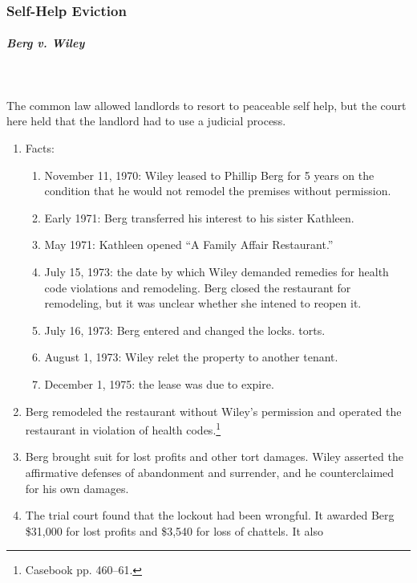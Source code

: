 \subsubsection{Self-Help Eviction}

\paragraph{\emph{Berg v. Wiley}}
~\\\\
The common law allowed landlords to resort to peaceable self help, but the 
court here held that the landlord had to use a judicial process.

\begin{enumerate}
    \item Facts:
    \begin{enumerate}
        \item November 11, 1970: Wiley leased to Phillip Berg for 5 years on 
        the condition that he would not remodel the premises without 
        permission.
        \item Early 1971: Berg transferred his interest to his sister 
        Kathleen.
        \item May 1971: Kathleen opened ``A Family Affair Restaurant.''
        \item July 15, 1973: the date by which Wiley demanded remedies for
        health code violations and remodeling. Berg closed the restaurant for 
        remodeling, but it was unclear whether she intened to reopen it.
        \item July 16, 1973: Berg entered and changed the locks.
        torts.
        \item August 1, 1973: Wiley relet the property to another tenant.
        \item December 1, 1975: the lease was due to expire.
    \end{enumerate}
    \item Berg remodeled the restaurant without Wiley's permission and 
    operated the restaurant in violation of health codes.\footnote{Casebook 
    pp. 460--61.}
    \item Berg brought suit for lost profits and other tort damages. Wiley 
    asserted the affirmative defenses of abandonment and surrender, and he 
    counterclaimed for his own damages. 
    \item The trial court found that the lockout had been wrongful. It awarded 
    Berg \$31,000 for lost profits and \$3,540 for loss of chattels. It also 

\end{enumerate}

